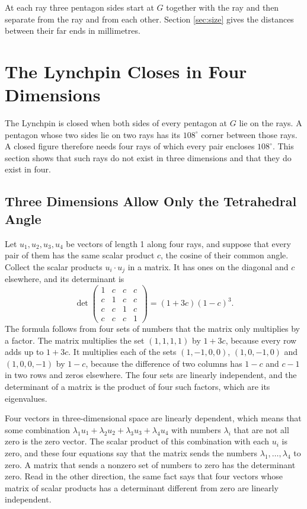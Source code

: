 \documentclass[a4paper,12pt]{article}
\begin{document}
At each ray three pentagon sides start at \( G \) together with the ray and then separate from the ray and from each other. Section \ref{sec:size} gives the distances between their far ends in millimetres.


\section{The Lynchpin Closes in Four Dimensions}
\label{sec:4d}
The Lynchpin is closed when both sides of every pentagon at \( G \) lie on the rays. A pentagon whose two sides lie on two rays has its \( 108^\circ \) corner between those rays. A closed figure therefore needs four rays of which every pair encloses \( 108^\circ \). This section shows that such rays do not exist in three dimensions and that they do exist in four.

\subsection{Three Dimensions Allow Only the Tetrahedral Angle}
Let \( u_1, u_2, u_3, u_4 \) be vectors of length 1 along four rays, and suppose that every pair of them has the same scalar product \( c \), the cosine of their common angle. Collect the scalar products \( u_i \cdot u_j \) in a matrix. It has ones on the diagonal and \( c \) elsewhere, and its determinant is
\[
\det \begin{pmatrix} 1 & c & c & c \\ c & 1 & c & c \\ c & c & 1 & c \\ c & c & c & 1 \end{pmatrix} = (1 + 3c)(1 - c)^3 .
\]
The formula follows from four sets of numbers that the matrix only multiplies by a factor. The matrix multiplies the set \( (1, 1, 1, 1) \) by \( 1 + 3c \), because every row adds up to \( 1 + 3c \). It multiplies each of the sets \( (1, -1, 0, 0) \), \( (1, 0, -1, 0) \) and \( (1, 0, 0, -1) \) by \( 1 - c \), because the difference of two columns has \( 1 - c \) and \( c - 1 \) in two rows and zeros elsewhere. The four sets are linearly independent, and the determinant of a matrix is the product of four such factors, which are its eigenvalues.

Four vectors in three-dimensional space are linearly dependent, which means that some combination \( \lambda_1 u_1 + \lambda_2 u_2 + \lambda_3 u_3 + \lambda_4 u_4 \) with numbers \( \lambda_i \) that are not all zero is the zero vector. The scalar product of this combination with each \( u_i \) is zero, and these four equations say that the matrix sends the numbers \( \lambda_1, \dots, \lambda_4 \) to zero. A matrix that sends a nonzero set of numbers to zero has the determinant zero. Read in the other direction, the same fact says that four vectors whose matrix of scalar products has a determinant different from zero are linearly independent.
\end{document}
